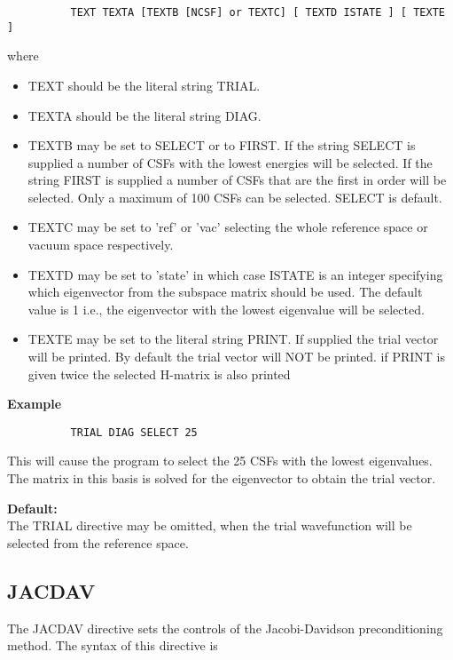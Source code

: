 \documentclass[11pt,fleqn]{article}
\begin{document}
\begin{enumerate}
{
\footnotesize
\begin{verbatim}
          TEXT TEXTA [TEXTB [NCSF] or TEXTC] [ TEXTD ISTATE ] [ TEXTE ]
\end{verbatim}
}
where
\begin{itemize}
\item TEXT   should be the literal string TRIAL.
\item TEXTA  should be the literal string DIAG.
\item TEXTB  may be set to SELECT or to FIRST. If the string SELECT is 
supplied a number of CSFs with the lowest energies will be selected. If 
the string FIRST is supplied a number of CSFs that are the first in 
order will be selected. Only a maximum of 100 CSFs can be selected.
SELECT is default.
\item TEXTC may be set to 'ref' or 'vac' selecting the whole reference 
space or vacuum space respectively. 
\item TEXTD may be set to 'state' in which case ISTATE is an integer 
specifying which eigenvector from the subspace matrix should be used. 
The default value is 1 i.e., the eigenvector with the lowest 
eigenvalue will be selected.
\item TEXTE  may be set to the literal string PRINT. If supplied the
trial vector will be printed. By default the trial vector will NOT be
printed. if PRINT is given twice the selected H-matrix is also printed
\end{itemize}
{\bf Example}
{
\footnotesize
\begin{verbatim}
          TRIAL DIAG SELECT 25
\end{verbatim}
}
This will cause the program to select the 25 CSFs with the lowest 
eigenvalues. The matrix in this basis is solved for the eigenvector to
obtain the trial vector.
\end{enumerate}

{\bf Default:}\\
The TRIAL directive may be omitted, when the trial wavefunction will be
selected from the reference space.

\subsection[JACDAV]{JACDAV}

The JACDAV directive sets the controls of the Jacobi-Davidson 
preconditioning method. The syntax of this directive is 
\end{document}
